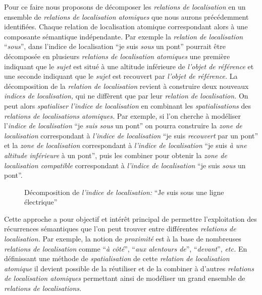 Pour ce faire nous proposons de décomposer les \emph{relations de
  localisation} en un ensemble de \emph{relations de localisation
  atomiques} que nous aurons précédemment identifiées. Chaque relation
de localisation atomique correspondant alors à une composante
sémantique indépendante. Par exemple la \emph{relation de
  localisation} \enquote{\emph{sous}}, dans l'indice de localisation
\enquote{je suis \emph{sous} un pont} pourrait être décomposée en
plusieurs \emph{relations de localisation atomiques} une première
indiquant que le \emph{sujet} est situé à une altitude inférieure de
\emph{l'objet de référence} et une seconde indiquant que le
\emph{sujet} est recouvert par \emph{l'objet de référence.} La
décomposition de la \emph{relation de localisation} revient à
construire deux nouveaux \emph{indices de localisation,} qui ne
diffèrent que par leur \emph{relation de localisation.} On peut alors
\emph{spatialiser} \emph{l'indice de localisation} en combinant les
\emph{spatialisations} des \emph{relations de localisations
  atomiques.} Par exemple, si l'on cherche à modéliser l'\emph{indice
  de localisation} \enquote{je \emph{suis sous} un pont} on pourra
construire la \emph{zone de localisation} correspondant à
\emph{l'indice de localisation} \enquote{je suis \emph{recouvert} par
  un pont} et la \emph{zone de localisation} correspondant à
\emph{l'indice de localisation} \enquote{je suis \emph{à une altitude
    inférieure} à un pont}, puis les combiner pour obtenir la
\emph{zone de localisation compatible} correspondant à \emph{l'indice
  de localisation} \enquote{je suis \emph{sous} un pont}.

\begin{figure}
  \centering
  \caption[Illustration de la décomposition d'un \emph{indice de
    localisation}]{Décomposition de \emph{l'indice de localisation:}
    \enquote{Je suis sous une ligne électrique}}
  \label{fig:dec_sous}
\end{figure}

Cette approche a pour objectif et intérêt principal de permettre
l'exploitation des récurrences sémantiques que l'on peut trouver entre
différentes \emph{relations de localisation.} Par exemple, la notion
de \emph{proximité} est à la base de nombreuses \emph{relations de
  localisation} comme \enquote{\emph{à côté}}, \enquote{\emph{aux
    alentours de}}, \enquote{\emph{devant}}, \emph{etc.} En
définissant une méthode de \emph{spatialisation} de cette
\emph{relation de localisation atomique} il devient possible de la
réutiliser et de la combiner à d'autres \emph{relations de
  localisation atomiques} permettant ainsi de modéliser un grand
ensemble de \emph{relations de localisations.}

